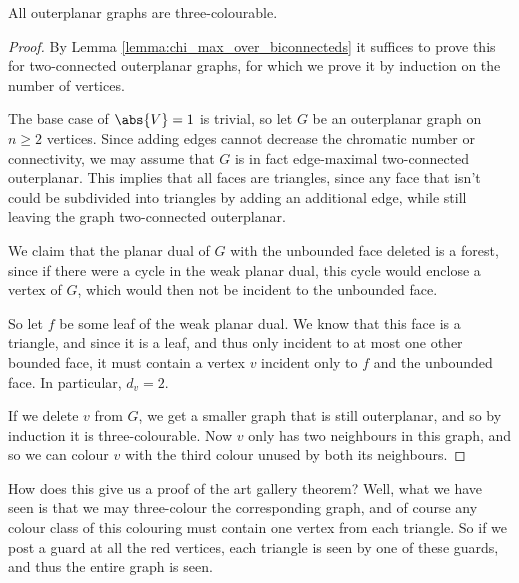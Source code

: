 \documentclass[nobib]{tufte-handout}
\begin{document}
\begin{theorem}
  All outerplanar graphs are three-colourable.

  \begin{proof}
    By Lemma \ref{lemma:chi_max_over_biconnecteds} it suffices to prove this for two-connected outerplanar graphs, for which we prove it by induction on the number of vertices. 
    
    The base case of $\abs{V} = 1$ is trivial, so let $G$ be an outerplanar graph on $n \geq 2$ vertices. Since adding edges cannot decrease the chromatic number or connectivity, we may assume that $G$ is in fact edge-maximal two-connected outerplanar. This implies that all faces are triangles, since any face that isn't could be subdivided into triangles by adding an additional edge, while still leaving the graph two-connected outerplanar.

    We claim that the planar dual of $G$ with the unbounded face deleted is a forest, since if there were a cycle in the weak planar dual, this cycle would enclose a vertex of $G$, which would then not be incident to the unbounded face.

    So let $f$ be some leaf of the weak planar dual. We know that this face is a triangle, and since it is a leaf, and thus only incident to at most one other bounded face, it must contain a vertex $v$ incident only to $f$ and the unbounded face. In particular, $d_v = 2$.

    If we delete $v$ from $G$, we get a smaller graph that is still outerplanar, and so by induction it is three-colourable. Now $v$ only has two neighbours in this graph, and so we can colour $v$ with the third colour unused by both its neighbours.
  \end{proof}
\end{theorem}

How does this give us a proof of the art gallery theorem? Well, what we have seen is that we may three-colour the corresponding graph, and of course any colour class of this colouring must contain one vertex from each triangle. So if we post a guard at all the red vertices, each triangle is seen by one of these guards, and thus the entire graph is seen.
\end{document}
